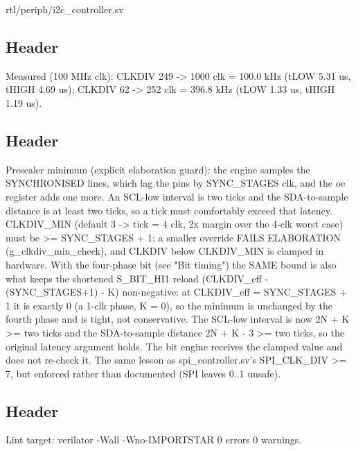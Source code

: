 \begin{relocated}{rtl/periph/i2c_controller.sv}

\subsection*{Header}

\begin{textblock}
Measured (100 MHz clk): CLKDIV 249 -> 1000 clk = 100.0 kHz (tLOW 5.31 us, tHIGH 4.69 us); CLKDIV 62
-> 252 clk = 396.8 kHz (tLOW 1.33 us, tHIGH 1.19 us).
\end{textblock}

\subsection*{Header}

\begin{textblock}
Prescaler minimum (explicit elaboration guard): the engine samples the SYNCHRONISED lines, which
lag the pins by SYNC_STAGES clk, and the oe register adds one more. An SCL-low interval is two
ticks and the SDA-to-sample distance is at least two ticks, so a tick must comfortably exceed
that latency. CLKDIV_MIN (default 3 -> tick = 4 clk, 2x margin over the 4-clk worst case) must be
>= SYNC_STAGES + 1; a smaller override FAILS ELABORATION (g_clkdiv_min_check), and CLKDIV below
CLKDIV_MIN is clamped in hardware. With the four-phase bit (see "Bit timing") the SAME bound is
also what keeps the shortened S_BIT_HI1 reload (CLKDIV_eff - (SYNC_STAGES+1) - K) non-negative:
at CLKDIV_eff = SYNC_STAGES + 1 it is exactly 0 (a 1-clk phase, K = 0), so the minimum is unchanged
by the fourth phase and is tight, not conservative. The SCL-low interval is now 2N + K >= two ticks
and the SDA-to-sample distance 2N + K - 3 >= two ticks, so the original latency argument holds.
The bit engine receives the clamped value and does not re-check it.
The same lesson as spi_controller.sv's SPI_CLK_DIV >= 7, but enforced rather than documented (SPI
leaves 0..1 unsafe).
\end{textblock}

\subsection*{Header}

\begin{textblock}
Lint target: verilator -Wall -Wno-IMPORTSTAR 0 errors 0 warnings.
\end{textblock}


\end{relocated}
